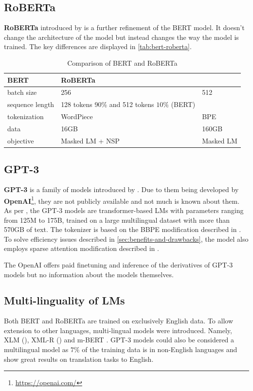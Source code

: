\subsection{RoBERTa}
\textbf{RoBERTa} introduced by \cite{liuRoBERTaRobustlyOptimized2019} is a further refinement of the BERT model.
It doesn't change the architecture of the model but instead changes the way the model is trained.
The key differences are displayed in \autoref{tab:bert-roberta}.
\begin{table}[h]
    \centering\footnotesize\sf
    \begin{tabular}{lll}
        \toprule
        {} BERT & RoBERTa \\
        \midrule
        batch size & 256 & 512 \\
        sequence length & 128 tokens 90\% and 512 tokens $10\%$ (BERT) \\
        tokenization & WordPiece & BPE \\
        data & 16GB & 160GB \\
        objective & Masked LM + NSP & Masked LM \\
        \bottomrule
    \end{tabular}
    \caption{Comparison of BERT and RoBERTa}
    \label{tab:bert-roberta}
\end{table}

\subsection{GPT-3}
\textbf{GPT-3} is a family of models introduced by \cite{brownLanguageModelsAre2020b}.
Due to them being developed by \textbf{OpenAI}\footnote{\url{https://openai.com/}}, they are not publicly available and not much is known about them.
As per \cite{brownLanguageModelsAre2020b}, the GPT-3 models are transformer-based LMs with parameters ranging from 125M to 175B, trained on
a large multilingual dataset with more than 570GB of text. The tokenizer is based on the BBPE modification described in \cite{radfordLanguageModelsArea}.
To solve efficiency issues described in \autoref{sec:benefits-and-drawbacks}, the model also employs sparse attention modification described in \cite{childGeneratingLongSequences2019}.

The OpenAI offers paid finetuning and inference of the derivatives of GPT-3 models but no information about the models themselves.

\subsection{Multi-linguality of LMs}
\label{sec:multilinguality}
Both BERT and RoBERTa are trained on exclusively English data. To allow extension to other languages,
multi-lingual models were introduced. Namely, XLM (\cite{lampleCrosslingualLanguageModel2019}), XML-R (\cite{conneauUnsupervisedCrosslingualRepresentation2020})
and m-BERT . GPT-3 models could also be considered a multilingual model as $7\%$ of the training data is in non-English languages
and show great results on translation tasks to English.

